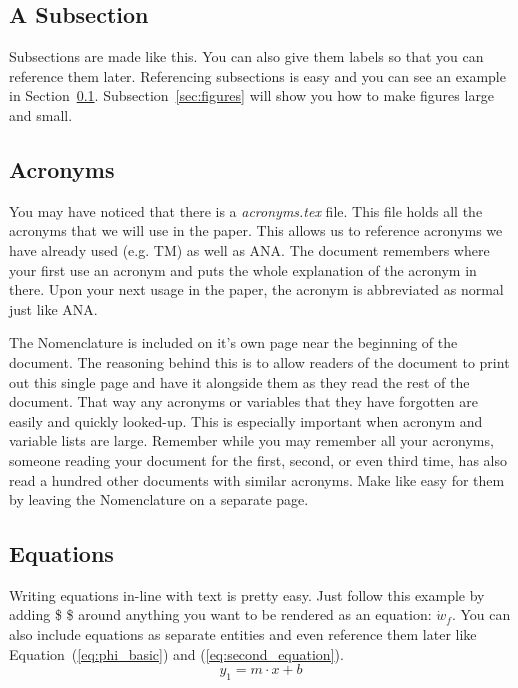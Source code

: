 \documentclass[]{NASA}
\begin{document}
\begin{flushleft}
\subsection{A Subsection}
\label{sec:subsections_exampel}
Subsections are made like this. You can also give them labels so that you can reference them later. Referencing subsections is easy and you can see an example in Section~\ref{sec:subsections_exampel}. Subsection~\ref{sec:figures} will show you how to make figures large and small.

\subsection{Acronyms}
\label{sec:acronyms}
You may have noticed that there is a \textit{acronyms.tex} file. This file holds all the acronyms that we will use in the paper. This allows us to reference acronyms we have already used (e.g. \ac{TM}) as well as \ac{ANA}. The document remembers where your first use an acronym and puts the whole explanation of the acronym in there. Upon your next usage in the paper, the acronym is abbreviated as normal just like \ac{ANA}. 

The Nomenclature is included on it's own page near the beginning of the document. The reasoning behind this is to allow readers of the document to print out this single page and have it alongside them as they read the rest of the document. That way any acronyms or variables that they have forgotten are easily and quickly looked-up. This is especially important when acronym and variable lists are large. Remember while you may remember all your acronyms, someone reading your document for the first, second, or even third time, has also read a hundred other documents with similar acronyms. Make like easy for them by leaving the Nomenclature on a separate page.
\subsection{Equations}
\label{sec:equations}
Writing equations in-line with text is pretty easy. Just follow this example by adding \$ \$ around anything you want to be rendered as an equation: $\dot{w}_f$. You can also include equations as separate entities and even reference them later like  Equation~(\ref{eq:phi_basic}) and (\ref{eq:second_equation}).
\begin{equation}
\label{eq:phi_basic}
    y_1 = m \cdot x + b 
\end{equation}


\end{flushleft}
\end{document}

